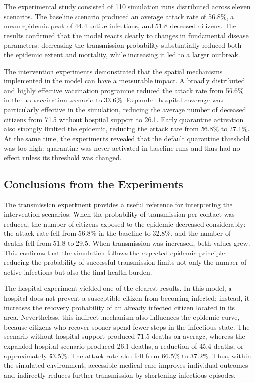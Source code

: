 \documentclass[english]{projectreport}
\begin{document}
The experimental study consisted of 110 simulation runs distributed
across eleven scenarios. The baseline scenario produced an average attack
rate of 56.8\%, a mean epidemic peak of 44.4 active infections, and 51.8
deceased citizens. The results confirmed that the model reacts clearly to
changes in fundamental disease parameters: decreasing the transmission
probability substantially reduced both the epidemic extent and mortality,
while increasing it led to a larger outbreak.

The intervention experiments demonstrated that the spatial mechanisms
implemented in the model can have a measurable impact. A broadly
distributed and highly effective vaccination programme reduced the attack
rate from 56.6\% in the no-vaccination scenario to 33.6\%. Expanded
hospital coverage was particularly effective in the simulation, reducing
the average number of deceased citizens from 71.5 without hospital
support to 26.1. Early quarantine activation also strongly limited the
epidemic, reducing the attack rate from 56.8\% to 27.1\%. At the same
time, the experiments revealed that the default quarantine threshold was
too high: quarantine was never activated in baseline runs and thus had no
effect unless its threshold was changed.

\subsection{Conclusions from the Experiments}
\label{sec:conclusions-experiments}

The transmission experiment provides a useful reference for interpreting
the intervention scenarios. When the probability of transmission per
contact was reduced, the number of citizens exposed to the epidemic
decreased considerably: the attack rate fell from 56.8\% in the
baseline to 32.8\%, and the number of deaths fell from 51.8 to 29.5.
When transmission was increased, both values grew. This confirms that
the simulation follows the expected epidemic principle: reducing the
probability of successful transmission limits not only the number of
active infections but also the final health burden.

The hospital experiment yielded one of the clearest results. In this
model, a hospital does not prevent a susceptible citizen from becoming
infected; instead, it increases the recovery probability of an already
infected citizen located in its area. Nevertheless, this indirect
mechanism also influences the epidemic curve, because citizens who
recover sooner spend fewer steps in the infectious state. The scenario
without hospital support produced 71.5 deaths on average, whereas the
expanded hospital scenario produced 26.1 deaths, a reduction of 45.4
deaths, or approximately 63.5\%. The attack rate also fell from 66.5\%
to 37.2\%. Thus, within the simulated environment, accessible medical
care improves individual outcomes and indirectly reduces further
transmission by shortening infectious episodes.
\end{document}
